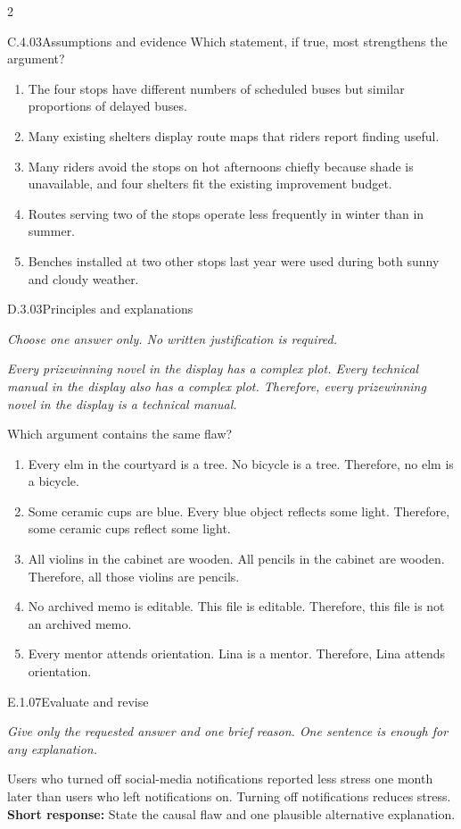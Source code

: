 \documentclass[9pt]{extarticle}
\newcommand{\choice}[1]{\item #1}
\begin{document}
\begin{multicols}{2}
\begin{DenseCoreProblem}{C.4.03}{Assumptions and evidence}
Which statement, if true, most strengthens the argument?
\begin{enumerate}[label=(\alph*)]
  \choice{The four stops have different numbers of scheduled buses but similar proportions of delayed buses.}
  \choice{Many existing shelters display route maps that riders report finding useful.}
  \choice{Many riders avoid the stops on hot afternoons chiefly because shade is unavailable, and four shelters fit the existing improvement budget.}
  \choice{Routes serving two of the stops operate less frequently in winter than in summer.}
  \choice{Benches installed at two other stops last year were used during both sunny and cloudy weather.}
\end{enumerate}
\end{DenseCoreProblem}
\begin{DenseCoreProblem}{D.3.03}{Principles and explanations}
{\scriptsize\textit{Choose one answer only. No written justification is required.}\par}
\emph{Every prizewinning novel in the display has a complex plot. Every technical manual in the display also has a complex plot. Therefore, every prizewinning novel in the display is a technical manual.}

Which argument contains the same flaw?
\begin{enumerate}[label=(\alph*)]
  \choice{Every elm in the courtyard is a tree. No bicycle is a tree. Therefore, no elm is a bicycle.}
  \choice{Some ceramic cups are blue. Every blue object reflects some light. Therefore, some ceramic cups reflect some light.}
  \choice{All violins in the cabinet are wooden. All pencils in the cabinet are wooden. Therefore, all those violins are pencils.}
  \choice{No archived memo is editable. This file is editable. Therefore, this file is not an archived memo.}
  \choice{Every mentor attends orientation. Lina is a mentor. Therefore, Lina attends orientation.}
\end{enumerate}
\end{DenseCoreProblem}
\begin{DenseCoreProblem}{E.1.07}{Evaluate and revise}
{\scriptsize\textit{Give only the requested answer and one brief reason. One sentence is enough for any explanation.}\par}
Users who turned off social-media notifications reported less stress one month later than users who left notifications on. Turning off notifications reduces stress.
\textbf{Short response:} State the causal flaw and one plausible alternative explanation.
\end{DenseCoreProblem}
\end{multicols}
\end{document}
